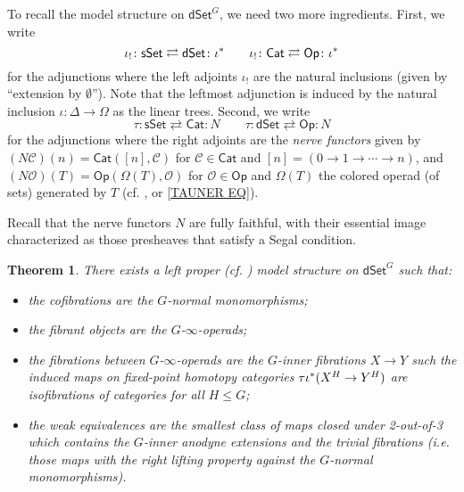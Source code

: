 \documentclass[a4paper,10pt
,draft
]{article}%
\numberwithin{equation}{section}
\numberwithin{figure}{section}
\newtheorem{theorem}[equation]{Theorem}%
\theoremstyle{definition} %
\newcommand{\dSet}{\mathsf{dSet}}
\newcommand{\1}{\ensuremath{\mathbbm 1}}%
\begin{document}
To recall the model structure on $\mathsf{dSet}^G$,
we need two more ingredients.
First, we write
\begin{equation}\label{IOTASHADJ EQ}
	\iota_! \colon 
	\mathsf{sSet}
	\rightleftarrows
	\mathsf{dSet}
	\colon
	\iota^{\**}
\qquad
	\iota_! \colon 
	\mathsf{Cat}
	\rightleftarrows
	\mathsf{Op}
	\colon
	\iota^{\**}
\end{equation}
for the adjunctions
where the left adjoints $\iota_!$
are the natural inclusions
(given by ``extension by $\emptyset$'').
Note that the leftmost adjunction is induced by the natural inclusion
$\iota \colon \Delta \to \Omega$
as the linear trees.
Second, we write
\begin{equation}\label{TAUADJ EQ}
	\tau \colon 
	\mathsf{sSet}
	\rightleftarrows
	\mathsf{Cat}
	\colon
	N
\qquad
	\tau \colon 
	\mathsf{dSet}
	\rightleftarrows
	\mathsf{Op}
	\colon
	N
\end{equation}
for the adjunctions where the right adjoints are the 
\emph{nerve functors}
given by
$(N \mathcal{C})(n) = 
\mathsf{Cat}\left([n],\mathcal{C}\right)$
for $\mathcal{C}\in \mathsf{Cat}$
and $[n] = (0 \to 1 \to \cdots \to n)$,
and
$(N \mathcal{O})(T) = 
\mathsf{Op}\left(\Omega(T),\mathcal{O}\right)$
for $\mathcal{O}\in \mathsf{Op}$
and $\Omega(T)$ the colored operad (of sets) generated by $T$
(cf. \cite[\S 3]{MW07}, \cite[Rem. 4.4, Ex. 4.6]{Per18} or \eqref{TAUNER EQ}).

Recall \cite[Prop. 5.3 and Thm. 6.1]{MW09}
that the nerve functors $N$ are fully faithful, 
with their essential image characterized
as those presheaves 
that satisfy a Segal condition.


\begin{theorem}\label{DSETGMOD THM}
	{\cite[Thm 2.1]{Per18}}
There exists a left proper (cf. \cite[Prop. 8.8]{Per18}) model structure on $\dSet^G$ such that:
\begin{itemize}
	\item the cofibrations are the $G$-normal monomorphisms;
	\item the fibrant objects are the $G$-$\infty$-operads;
	\item the fibrations between
	$G$-$\infty$-operads 
	are the $G$-inner fibrations $X \to Y$
	such the induced maps on 
	fixed-point homotopy categories 
	$\tau \iota^{\**}(X^H \to Y^H)$ are isofibrations of categories for all $H \leq G$;
	\item the weak equivalences are the smallest class of maps closed under 2-out-of-3 which
	contains the $G$-inner anodyne extensions and the trivial fibrations
	(i.e. those maps with the right lifting property against the $G$-normal monomorphisms).
\end{itemize}
\end{theorem}
\end{document}
